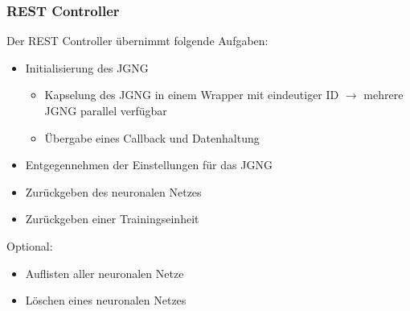 \begin{frame}
    \frametitle{REST Controller}
    Der REST Controller übernimmt folgende Aufgaben:
    \begin{itemize}
        \item Initialisierung des JGNG
        \begin{itemize}
            \item Kapselung des JGNG in einem Wrapper mit eindeutiger ID
            \newline $\rightarrow$ mehrere JGNG parallel verfügbar
            \item Übergabe eines Callback und Datenhaltung
        \end{itemize}
        \item Entgegennehmen der Einstellungen für das JGNG
        \item Zurückgeben des neuronalen Netzes
        \item Zurückgeben einer Trainingseinheit
    \end{itemize}
    Optional:
    \begin{itemize}
        \item Auflisten aller neuronalen Netze
        \item Löschen eines neuronalen Netzes
    \end{itemize}
\end{frame}
